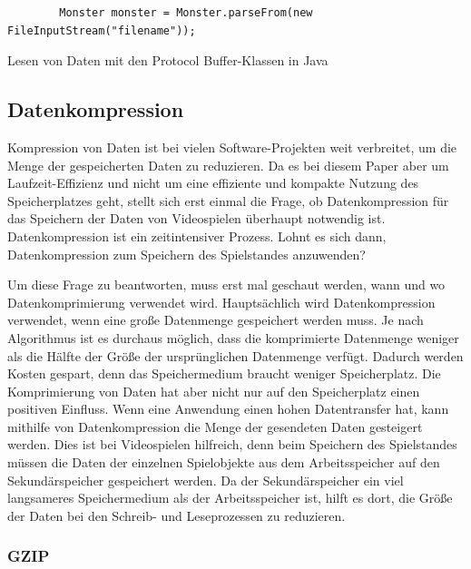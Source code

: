 \begin{listing}[htp]
    \begin{verbatim} 
        Monster monster = Monster.parseFrom(new FileInputStream("filename"));
    \end{verbatim}
    \caption{Lesen von Daten mit den Protocol Buffer-Klassen in Java}
    \label{lst:protobufJavaRead}
\end{listing}



\subsection{Datenkompression} \label{ssec:kompression}
Kompression von Daten ist bei vielen Software-Projekten weit verbreitet, um die Menge der gespeicherten Daten zu reduzieren. Da es bei diesem Paper aber um Laufzeit-Effizienz und nicht um eine effiziente und kompakte Nutzung des Speicherplatzes geht, stellt sich erst einmal die Frage, ob Datenkompression für das Speichern der Daten von Videospielen überhaupt notwendig ist. Datenkompression ist ein zeitintensiver Prozess. Lohnt es sich dann, Datenkompression zum Speichern des Spielstandes anzuwenden? 

Um diese Frage zu beantworten, muss erst mal geschaut werden, wann und wo Datenkomprimierung verwendet wird. Hauptsächlich wird Datenkompression verwendet, wenn eine große Datenmenge gespeichert werden muss. Je nach Algorithmus ist es durchaus möglich, dass die komprimierte Datenmenge weniger als die Hälfte der Größe der ursprünglichen Datenmenge verfügt. Dadurch werden Kosten gespart, denn das Speichermedium braucht weniger Speicherplatz. Die Komprimierung von Daten hat aber nicht nur auf den Speicherplatz einen positiven Einfluss. Wenn eine Anwendung einen hohen Datentransfer hat, kann mithilfe von Datenkompression die Menge der gesendeten Daten gesteigert werden. Dies ist bei Videospielen hilfreich, denn beim Speichern des Spielstandes müssen die Daten der einzelnen Spielobjekte aus dem Arbeitsspeicher auf den Sekundärspeicher gespeichert werden. Da der Sekundärspeicher ein viel langsameres Speichermedium als der Arbeitsspeicher ist, hilft es dort, die Größe der Daten bei den Schreib- und Leseprozessen zu reduzieren.\cite{mediumWhenDataCompression}

\subsubsection{GZIP}

